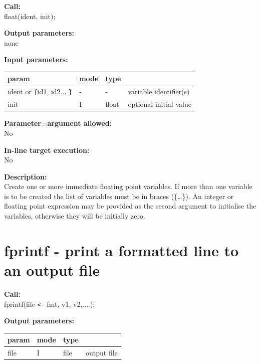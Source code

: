        {\bf Call:} \\
        float(ident, init);
        
        {\bf Output parameters:} \\
        none
        
        {\bf Input parameters:} \\
        \begin{tabular}{| l | l | l | l |}
        \hline
        param  & mode & type & \\
        \hline \hline
        ident or \verb'{'id1, id2... \verb'}' & - &  -  & variable identifier(s)   \\ \hline
        init                   & I & float & optional initial value \\ \hline
        \end{tabular}
        
        {\bf Parameter=argument allowed:} \\
        No
        
        {\bf In-line target execution:} \\
        No
        
        {\bf Description:} \\
        Create one or more immediate floating point variables. If more than one
        variable is to be created the list of variables must be in braces
        (\{\dots\}). An integer or floating point expression may be provided as
        the second argument to initialise the variables, otherwise they will be
        initially zero.



    \section{fprintf - print a formatted line to an output file}\label{sec:ipfprintf}

        {\bf Call:} \\
        fprintf(file \verb'<-' fmt, v1, v2,....);
        
        {\bf Output parameters:} \\
        \begin{tabular}{| l | l | l | l |}
        \hline
        param  & mode     & type  & \\
        \hline \hline
        file & I & file & output file   \\ \hline
        \end{tabular}
        
